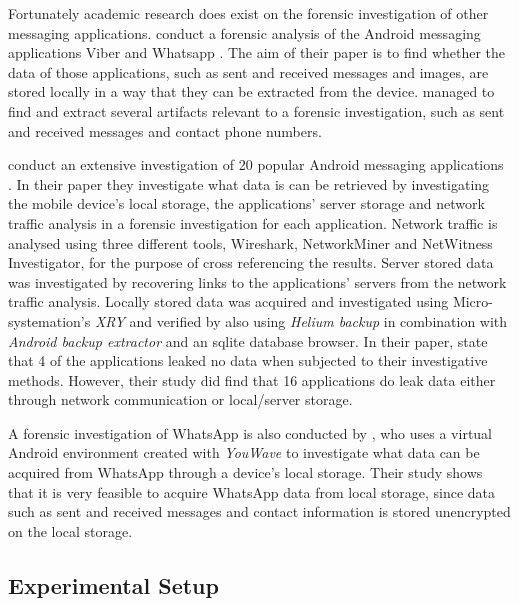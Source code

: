 \documentclass[conference]{IEEEtran}
\begin{document}
Fortunately academic research does exist on the forensic investigation of other
messaging applications. \citeauthor{mahajan2013forensic} conduct a forensic
analysis of the Android messaging applications Viber and Whatsapp
\cite{mahajan2013forensic}. The aim of their paper is to find whether the data
of those applications, such as sent and received messages and images, are stored
locally in a way that they can be extracted from the device.
\citeauthor{mahajan2013forensic} managed to find and extract several artifacts
relevant to a forensic investigation, such as sent and received messages and
contact phone numbers.

\citeauthor{walnycky2015network} conduct an extensive investigation of 20
popular Android messaging applications \cite{walnycky2015network}. In their
paper they investigate what data is can be retrieved by investigating the mobile
device's local storage, the applications' server storage and network traffic
analysis in a forensic investigation for each application. Network traffic is
analysed using three different tools, Wireshark, NetworkMiner and NetWitness
Investigator, for the purpose of cross referencing the results. Server stored
data was investigated by recovering links to the applications' servers from the
network traffic analysis. Locally stored data was acquired and investigated
using Micro-systemation's {\it XRY} and verified by also using {\it Helium
backup} in combination with {\it Android backup extractor} and an sqlite
database browser.  In their paper, \citeauthor{walnycky2015network} state that 4
of the applications leaked no data when subjected to their investigative
methods.  However, their study did find that 16 applications do leak data either
through network communication or local/server storage.

A forensic investigation of WhatsApp is also conducted by
\citeauthor{anglano2014forensic} \cite{anglano2014forensic}, who uses a virtual
Android environment created with {\it YouWave} to investigate what data can be
acquired from WhatsApp through a device's local storage. Their study shows that
it is very feasible to acquire WhatsApp data from local storage, since data such
as sent and received messages and contact information is stored unencrypted on
the local storage.

\subsection{Experimental Setup}\label{sec:setup}
\end{document}
